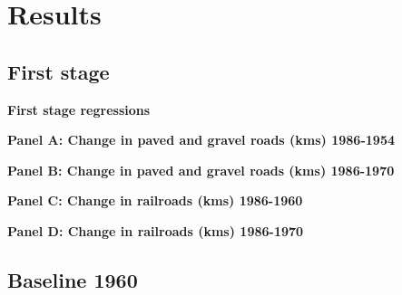 \documentclass{article}
\begin{document}
\section{Results}

\subsection{First stage}

\begin{table}[h!]
\caption{\textbf{First stage regressions}}
    \centering
  \begin{subtable}[t]{0.88\linewidth}
          \caption*{\textbf{Panel A: Change in paved and gravel roads (kms) 1986-1954}}

    \centering
    \resizebox{\textwidth}{!}{
    \vspace{0pt}    
    
    }
    \end{subtable}
      
  \begin{subtable}[t]{0.88\linewidth}
      \caption*{\textbf{Panel B: Change in paved and gravel roads (kms) 1986-1970}}
    \centering
     \resizebox{\textwidth}{!}{
    \vspace{0pt}    
    
    }
    \end{subtable}
    
  \begin{subtable}[t]{0.88\linewidth}
          \caption*{\textbf{Panel C: Change in railroads (kms) 1986-1960}}

    \centering
    \resizebox{\textwidth}{!}{
    \vspace{0pt}    
    
    }
    \end{subtable}
      
  \begin{subtable}[t]{0.88\linewidth}
      \caption*{\textbf{Panel D: Change in railroads (kms) 1986-1970}}
    \centering
     \resizebox{\textwidth}{!}{
    \vspace{0pt}    
    
    }
    \end{subtable}
    
\end{table}

\clearpage

\subsection{Baseline 1960}
\end{document}

